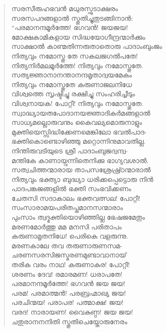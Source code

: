 \begin{verse}
സരസീരുഹഭവന്‍ മധുരസ്ഫുടാക്ഷരം\\
സരസപദങ്ങളാല്‍ സ്തുതിച്ചുതുടങ്ങിനാന്‍:\\
“പരമാനന്ദമൂര്‍ത്തേ! ഭഗവന്‍! ജയജയ!\\
മോക്ഷകാമികളായ സിദ്ധയോഗീന്ദ്രന്മാര്‍ക്കും\\
സാക്ഷാല്‍ കാണ്മതിന്നരുതാതൊരു പാദാംബുംജം\\
നിത്യവും നമോസ്തു തേ സകലജഗല്‍പതേ!\\
നിത്യനിര്‍മലമൂര്‍ത്തേ! നിത്യവും നമോസ്തുതേ.\\
സത്യജ്ഞാനാനന്താനന്ദമൃതാദ്വയമേകം\\
നിത്യവും നമോസ്തുതേ കരുണാജലനിധേ\\
വിശ്വത്തെ സൃഷ്ടിച്ചു രക്ഷിച്ചു സംഹരിച്ചീടും\\
വിശ്വനായക! പോറ്റീ! നിത്യവും നമോസ്തുതേ.\\
സ്വാദ്ധ്യായതപോദാനയജ്ഞാദികര്‍മങ്ങളാല്‍\\
സാധ്യമല്ലൊരുവനും കൈവല്യമൊരുനാളും\\
മുക്തിയെസ്സിദ്ധിക്കേണമെങ്കിലോ ഭവല്‍പാദ-\\
ഭക്തികൊണ്ടൊഴിഞ്ഞു മറ്റൊന്നിനുമാവതില്ല.\\
നിന്തിരുവടിയുടെ ശ്രീ പാദാംബുജദ്വന്ദ്വ-\\
മന്തികേ കാണായ്വന്നിതെനിക്കു ഭാഗ്യവശാല്‍.\\
സത്വചിത്തന്മാരായ താപസശ്രേഷ്ര്ഠന്മാരാല്‍\\
നിത്യവും ഭക്ത്യാ ബുദ്ധ്യാ ധരിക്കപ്പെട്ടൊരു നിന്‍\\
പാദപങ്കജങ്ങളില്‍ ഭക്തി സംഭവിക്കണം\\
ചേതസി സദാകാലം ഭക്തവത്സല! പോറ്റീ!\\
സംസാരാമയപരിതപ്തമാനസന്മാരാം\\
പുംസാം ത്വദ്ഭക്തിയൊഴിഞ്ഞില്ല ഭേഷജമേതും\\
മരണമോര്‍ത്തു മമ മനസി പരിതാപം\\
കരുണാമൃതനിധേ! പെരികെ വളരുന്നു.\\
മരണകാലേ തവ തരുണാരുണസമ-\\
ചരണസരസിജസ്മരണമുണ്ടാവാനായ്\\
തരിക വരം നാഥ! കരുണാകര! പോറ്റീ!\\
ശരണം ദേവ! രമാരമണ! ധരാപതേ!\\
പരമാനന്ദമൂര്‍ത്തേ! ഭഗവന്‍ ജയ ജയ!\\
പരമ! പരമാത്മന്‍! പരബ്രഹ്മാഖ്യ ജയ!\\
പരചിന്മയ! പരാപര! പത്മാക്ഷ! ജയ!\\
വരദ! നാരായണ! വൈകുണ്ഠ! ജയ ജയ!\\
ചതുരാനനനിതി സ്തുതിചെയ്തോരുനേരം\\

\end{verse}
